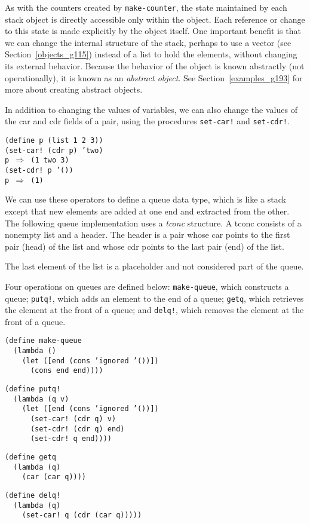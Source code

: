 As with the counters created by \texttt{make-counter}, the state maintained
by each stack object is directly accessible only within the object.
Each reference or change to this state is made explicitly by the object
itself.
One important benefit is that we can change the internal structure
of the stack, perhaps to use a vector (see Section \ref{objects_g115}) instead
of a list to hold the elements,
without changing its external behavior.
Because the behavior of the object is known abstractly (not operationally),
it is known as an \textit{abstract object}.
See Section \ref{examples_g193} for more about creating \label{start_s179}abstract objects.


In addition to changing the values of variables, we can also change
the values of the car and cdr fields of a pair, using the procedures
\texttt{set-car!} and \texttt{set-cdr!}.


\begin{alltt}
(define p (list 1 2 3))
(set-car! (cdr p) 'two)
p \(\Rightarrow\) (1 two 3)
(set-cdr! p '())
p \(\Rightarrow\) (1)
\end{alltt}


\label{start_queue_datatype}\label{start_s180}We can use these operators to define a queue
data type, which is like a stack except that new elements are added at
one end and extracted from the other.
The following queue implementation uses a \label{start_s181}\textit{tconc}
structure.
A tconc consists of a nonempty list and a header.
The header is a pair whose car points to the first pair (head) of the
list and whose cdr points to the last pair (end) of the list.


\begin{figure}[H]
\centering

\end{figure}



The last element of the list is a placeholder and not considered part
of the queue.


Four operations on queues are defined below:
\label{start_s182}\texttt{make-queue}, which constructs a queue;
\label{start_s183}\texttt{putq!}, which adds an element to the end
of a queue;
\label{start_s184}\texttt{getq}, which retrieves the element at the
front of a queue; and
\label{start_s185}\texttt{delq!}, which removes the element at the
front of a queue.


\begin{alltt}
(define make-queue
  (lambda ()
    (let ([end (cons 'ignored '())])
      (cons end end))))

(define putq!
  (lambda (q v)
    (let ([end (cons 'ignored '())])
      (set-car! (cdr q) v)
      (set-cdr! (cdr q) end)
      (set-cdr! q end))))

(define getq
  (lambda (q)
    (car (car q))))

(define delq!
  (lambda (q)
    (set-car! q (cdr (car q)))))
\end{alltt}


